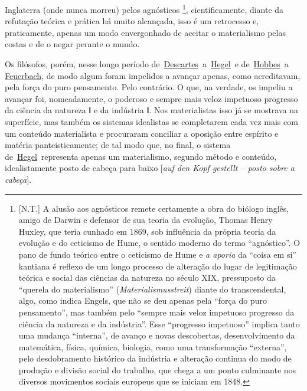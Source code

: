 Inglaterra (onde nunca morreu) pelos agnósticos \footnote{{[}N.T.{]} A
  alusão aos agnósticos remete certamente a obra do biólogo inglês,
  amigo de Darwin e defensor de sua teoria da evolução, Thomas Henry
  Huxley, que teria cunhado em 1869, sob influência da própria teoria da
  evolução e do ceticismo de Hume, o sentido moderno do termo
  ``agnóstico''. O pano de fundo teórico entre o ceticismo de Hume e
  \emph{a aporia} da ``coisa em si'' kantiana é reflexo de um longo
  processo de alteração do lugar de legitimação teórica e social das
  ciências da natureza no século XIX, pressuposto da ``querela do
  materialismo'' (\emph{Materialismusstreit}) diante do transcendental,
  algo, como indica Engels, que não se deu apenas pela ``força do puro
  pensamento'', mas também pelo ``sempre mais veloz impetuoso progresso
  da ciência da natureza e da indústria''. Esse ``progresso impetuoso''
  implica tanto uma mudança ``interna'', de avanço e novas descobertas,
  desenvolvimento da matemática, física, química, biologia, como uma
  transformação ``externa'', pelo desdobramento histórico da indústria e
  alteração continua do modo de produção e divisão social do trabalho,
  que chega a um ponto culminante nos diversos movimentos sociais
  europeus que se iniciam em 1848.}, cientificamente, diante da
refutação teórica e prática há muito alcançada, isso é um retrocesso e,
praticamente, apenas um modo envergonhado de aceitar o materialismo
pelas costas e de o negar perante o mundo.

Os filósofos, porém, nesse longo período
de~\href{https://www.marxists.org/portugues/dicionario/verbetes/d/descartes.htm}{Descartes}~a~\href{https://www.marxists.org/portugues/dicionario/verbetes/h/hegel.htm}{Hegel}~e
de~\href{https://www.marxists.org/portugues/dicionario/verbetes/h/hobbes_thomas.htm}{Hobbes}~a
\href{https://www.marxists.org/portugues/dicionario/verbetes/f/feuerbach.htm}{Feuerbach},
de modo algum foram impelidos a avançar apenas, como acreditavam, pela
força do puro pensamento. Pelo contrário. O que, na verdade, os impeliu
a avançar foi, nomeadamente, o poderoso e sempre mais veloz impetuoso
progresso da ciência da natureza ǁ e da indústria ǁ. Nos materialistas
isso já se mostrava na superfície, mas também os sistemas idealistas se
completarem cada vez mais com um conteúdo materialista e procuraram
conciliar a oposição entre espírito e matéria panteisticamente; de tal
modo que, no final, o sistema
de~\href{https://www.marxists.org/portugues/dicionario/verbetes/h/hegel.htm}{Hegel}~representa
apenas um materialismo, segundo método e conteúdo, idealistamente posto
de cabeça para baixo {[}\emph{auf den Kopf gestellt -- posto sobre a
cabeça}{]}.


